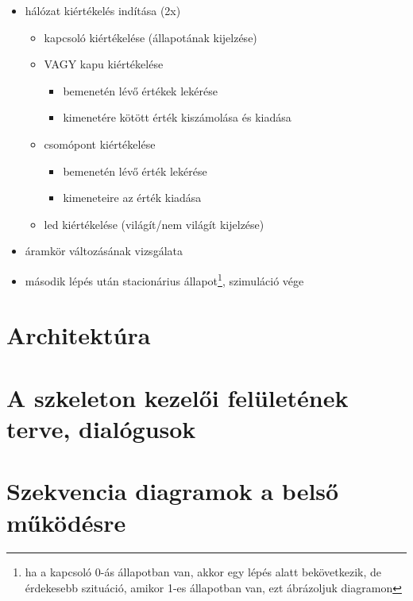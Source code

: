 {\begin{itemize}
\begin{itemize}
\setlength{\itemsep}{0cm}%
\setlength{\parskip}{0cm}%
\item hálózat kiértékelés indítása (2x)
\begin{itemize}
\setlength{\itemsep}{0cm}%
\setlength{\parskip}{0cm}%
\item kapcsoló kiértékelése (állapotának kijelzése)
\item VAGY kapu kiértékelése
\begin{itemize}
\setlength{\itemsep}{0cm}%
\setlength{\parskip}{0cm}%
\item bemenetén lévő értékek lekérése
\item kimenetére kötött érték kiszámolása és kiadása
\end{itemize}
\item csomópont kiértékelése
\begin{itemize}
\setlength{\itemsep}{0cm}%
\setlength{\parskip}{0cm}%
\item bemenetén lévő érték lekérése
\item kimeneteire az érték kiadása
\end{itemize}
\item led kiértékelése (világít/nem világít kijelzése)
\end{itemize}
\item áramkör változásának vizsgálata
\item második lépés után stacionárius állapot\footnote{ha a kapcsoló 0-ás állapotban van, akkor egy lépés alatt bekövetkezik, de érdekesebb szituáció, amikor 1-es állapotban van, ezt ábrázoljuk diagramon}, szimuláció vége
\end{itemize}
\end{itemize}
\vspace{-15pt}}

\section{Architektúra}

\section{A szkeleton kezelői felületének terve, dialógusok}

\section{Szekvencia diagramok a belső működésre}

